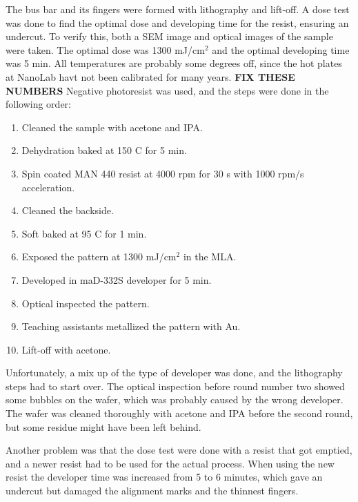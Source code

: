 The bus bar and its fingers were formed with lithography and lift-off.
A dose test was done to find the optimal dose and developing time for the resist, ensuring an undercut.
To verify this, both a SEM image and optical images of the sample were taken.
The optimal dose was 1300 mJ/cm$^2$ and the optimal developing time was 5 min.
All temperatures are probably some degrees off, since the hot plates at NanoLab havt not been calibrated for many years.
\textbf{FIX THESE NUMBERS}
Negative photoresist was used, and the steps were done in the following order:
\begin{enumerate}
    \item Cleaned the sample with acetone and IPA.
    \item Dehydration baked at 150 \textdegree C for 5 min.
    \item Spin coated MAN 440 resist at 4000 rpm for 30 s with 1000 rpm/s acceleration.
    \item Cleaned the backside.
    \item Soft baked at 95 \textdegree C for 1 min.
    \item Exposed the pattern at 1300 mJ/cm$^2$ in the MLA.
    \item Developed in maD-332S developer for 5 min.
    \item Optical inspected the pattern.
    \item Teaching assistants metallized the pattern with Au.
    \item Lift-off with acetone.
\end{enumerate}

Unfortunately, a mix up of the type of developer was done, and the lithography steps had to start over.
The optical inspection before round number two showed some bubbles on the wafer, which was probably caused by the wrong developer.
The wafer was cleaned thoroughly with acetone and IPA before the second round, but some residue might have been left behind.

Another problem was that the dose test were done with a resist that got emptied, and a newer resist had to be used for the actual process.
When using the new resist the developer time was increased from 5 to 6 minutes, which gave an undercut but damaged the alignment marks and the thinnest fingers.




